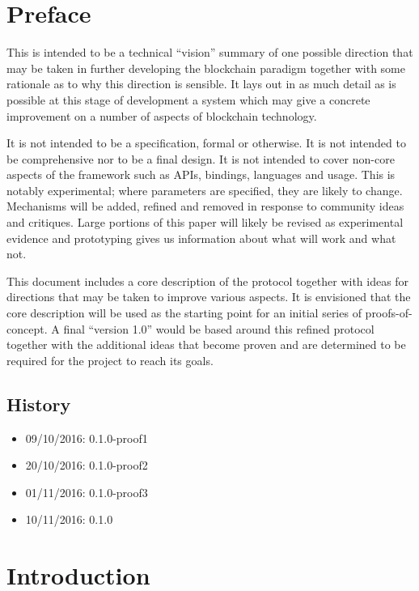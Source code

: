 \documentclass[9pt,oneside]{amsart}
\begin{document}
\setlength{\columnsep}{20pt}
\begin{multicols}{2}

\section{Preface}\label{preface}

 This is intended to be a technical ``vision'' summary of one possible direction that may be taken in further developing the blockchain paradigm together with some rationale as to why this direction is sensible. It lays out in as much detail as is possible at this stage of development a system which may give a concrete improvement on a number of aspects of blockchain technology.

 It is not intended to be a specification, formal or otherwise. It is not intended to be comprehensive nor to be a final design. It is not intended to cover non-core aspects of the framework such as APIs, bindings, languages and usage. This is notably experimental; where parameters are specified, they are likely to change. Mechanisms will be added, refined and removed in response to community ideas and critiques. Large portions of this paper will likely be revised as experimental evidence and prototyping gives us information about what will work and what not.

 This document includes a core description of the protocol together with ideas for directions that may be taken to improve various aspects. It is envisioned that the core description will be used as the starting point for an initial series of proofs-of-concept. A final ``version 1.0'' would be based around this refined protocol together with the additional ideas that become proven and are determined to be required for the project to reach its goals.

\subsection{History}\label{history}

\begin{itemize}
\item 09/10/2016: 0.1.0-proof1
\item 20/10/2016: 0.1.0-proof2
\item 01/11/2016: 0.1.0-proof3
\item 10/11/2016: 0.1.0
\end{itemize}

\section{Introduction}\label{introduction}


\end{multicols}
\end{document}
